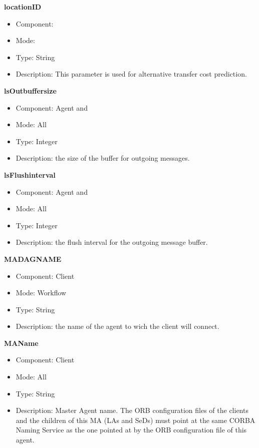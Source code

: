 \begin{description}


\item{\bf{locationID}}
  \begin{itemize}
  \item Component: \sed
  \item Mode: \dagda
  \item Type: String
  \item Description: This parameter is used for alternative transfer cost
  prediction.
  \end{itemize}

\item{\bf{lsOutbuffersize}}
  \begin{itemize}
  \item Component: Agent and \sed
  \item Mode: All
  \item Type: Integer
  \item Description: the size of the buffer for outgoing messages.
  \end{itemize}

\item{\bf{lsFlushinterval}}
  \begin{itemize}
  \item Component: Agent and \sed
  \item Mode: All
  \item Type: Integer
  \item Description: the flush interval for the outgoing message buffer.
  \end{itemize}

\item{\bf{MADAGNAME}}
  \begin{itemize}
  \item Component: Client
  \item Mode: Workflow
  \item Type: String
  \item Description: the name of the \madag agent to wich the client
    will connect.
  \end{itemize}

\item{\bf{MAName}}
  \begin{itemize}
  \item Component: Client
  \item Mode: All
  \item Type: String
  \item Description: Master Agent name.  The ORB configuration files of the clients
    and the children of this MA (LAs and SeDs) must point at the same CORBA
    Naming Service as the one pointed at by the ORB configuration file of
    this agent.
  \end{itemize}


\end{description}
